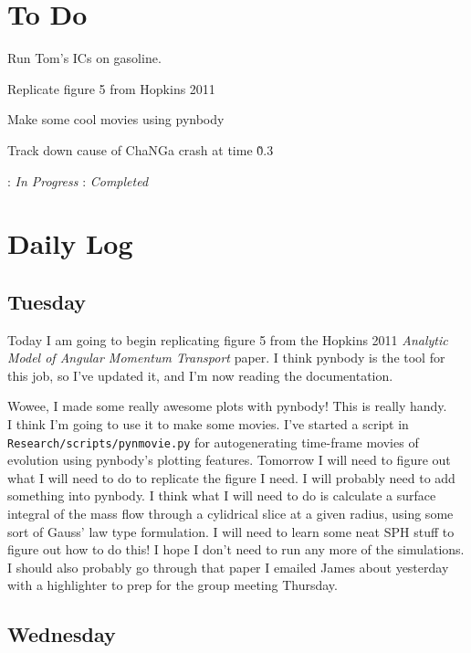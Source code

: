 \documentclass[11pt,letterpaper]{article}
\begin{document}
\section{To Do}
\begin{bullets}
\item[\checkmark] Run Tom's ICs on gasoline.
\item[\textleaf] Replicate figure 5 from Hopkins 2011
\item[\checkmark] Make some cool movies using pynbody
\item Track down cause of ChaNGa crash at time \~0.3
\end{bullets}

\textleaf : \textit{In Progress} \qquad \checkmark : \textit{Completed}
\section{Daily Log}

\subsection{Tuesday}

Today I am going to begin replicating figure 5 from the Hopkins 2011
\textit{
Analytic Model of Angular Momentum Transport} paper. I think pynbody is
the tool for this job, so I've updated it, and I'm now reading the
documentation.

Wowee, I made some really awesome plots with pynbody! This is really
handy.\\I think I'm going to use it to make some movies. I've started a
script in \verb!Research/scripts/pynmovie.py! for autogenerating
time-frame movies of evolution using pynbody's plotting features.
Tomorrow I will need to figure out what I will need to do to replicate
the figure I need. I will probably need to add something into pynbody. I
think what I will need to do is calculate a surface integral of the mass
flow through a cylidrical slice at a given radius, using some sort of
Gauss' law type formulation. I will need to learn some neat SPH stuff to
figure out how to do this! I hope I don't need to run any more of the
simulations. I should also probably go through that paper I emailed
James about yesterday with a highlighter to prep for the group meeting
Thursday.

\subsection{Wednesday}
\end{document}
